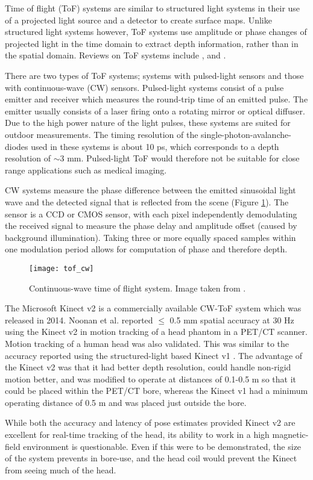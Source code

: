 \documentclass[class=article, crop=false]{standalone}
\begin{document}
Time of flight (ToF) systems are similar to structured light systems in their use of a projected light source and a detector to create surface maps. Unlike structured light systems however, ToF systems use amplitude or phase changes of projected light in the time domain to extract depth information, rather than in the spatial domain. Reviews on ToF systems include \cite{Horaud2016}, \cite{tofbook} and \cite{Kolb2010}.
\par 
There are two types of ToF systems; systems with pulsed-light sensors and those with continuous-wave (CW) sensors. Pulsed-light systems consist of a pulse emitter and receiver which measures the round-trip time of an emitted pulse. The emitter usually consists of a laser firing onto a rotating mirror or optical diffuser. Due to the high power nature of the light pulses, these systems are suited for outdoor measurements. The timing resolution of the single-photon-avalanche-diodes used in these systems is about 10 ps, which corresponds to a depth resolution of $\sim$3 mm. Pulsed-light ToF would therefore not be suitable for close range applications such as medical imaging.
\par 
CW systems measure the phase difference between the emitted sinusoidal light wave and the detected signal that is reflected from the scene (Figure \ref{tof_cw}). The sensor is a CCD or CMOS sensor, with each pixel independently demodulating the received signal to measure the phase delay and amplitude offset (caused by background illumination). Taking three or more equally spaced samples within one modulation period allows for computation of phase and therefore depth.

\begin{figure}
	\centering
	\texttt{[image: tof\_cw]}
	\caption{Continuous-wave time of flight system. Image taken from \parencite{Kolb2010}.}
	\label{tof_cw}
\end{figure}

\par 
The Microsoft Kinect v2 is a commercially available CW-ToF system which was released in 2014. Noonan et al. \parencite*{Noonan2015} reported $\leq$ 0.5 mm spatial accuracy at 30 Hz using the Kinect v2 in motion tracking of a head phantom in a PET/CT scanner. Motion tracking of a human head was also validated. This was similar to the accuracy reported using the structured-light based Kinect v1 \parencite{Noonan2012}. The advantage of the Kinect v2 was that it had better depth resolution, could handle non-rigid motion better, and was modified to operate at distances of 0.1-0.5 m so that it could be placed within the PET/CT bore, whereas the Kinect v1 had a minimum operating distance of 0.5 m and was placed just outside the bore. 
\par 
While both the accuracy and latency of pose estimates provided Kinect v2 are excellent for real-time tracking of the head, its ability to work in a high magnetic-field environment is questionable. Even if this were to be demonstrated, the size of the system prevents in bore-use, and the head coil would prevent the Kinect from seeing much of the head.
\end{document}

